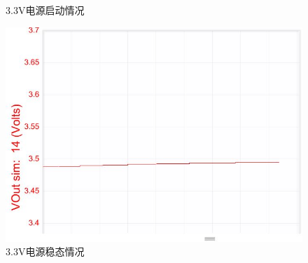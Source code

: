 \documentclass[a4paper]{paper}
\begin{document}
\begin{multicols}{2}
\begin{figure}[H]
        \caption{3.3V电源启动情况}
    \end{figure}
    \begin{figure}[H]
        \centering
        \includegraphics[width = 0.8\columnwidth]{3sim2.jpg}
        \caption{3.3V电源稳态情况}
    \end{figure}
\end{multicols}
\end{document}

